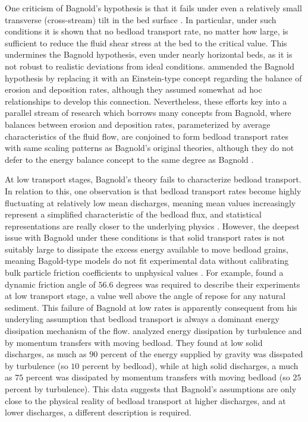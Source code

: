 \documentclass{article}
\begin{document}
One criticism of Bagnold's hypothesis is that it fails under even a relatively small transverse (cross-stream) tilt in the bed surface \citep{Seminara2002}. 
In particular, under such conditions it is shown that no bedload transport rate, no matter how large, is sufficient to reduce the fluid shear stress at the bed to the critical value.
This undermines the Bagnold hypothesis, even under nearly horizontal beds, as it is not robust to realistic deviations from ideal conditions. 
\citet{Parker2003} ammended the Bagnold hypothesis by replacing it with an Einstein-type concept regarding the balance of erosion and deposition rates, although they assumed somewhat ad hoc relationships to develop this connection. 
Nevertheless, these efforts key into a parallel stream of research which borrows many concepts from Bagnold, where balances between erosion and deposition rates, parameterized by average characteristics of the fluid flow, are conjoined to form bedload transport rates with same scaling patterns as Bagnold's original theories, although they do not defer to the energy balance concept to the same degree as Bagnold \citep{Charru2004, Charru2006, Lajenesse2010, Lajenesse2018}. 

At low transport stages, Bagnold's theory fails to characterize bedload transport.
In relation to this, one observation is that bedload transport rates become highly fluctuating at relatively low mean discharges, meaning mean values increasingly represent a simplified characteristic of the bedload flux, and statistical representations are really closer to the underlying physics \citep{Ancey2008}.
However, the deepest issue with Bagnold under these conditions is that solid transport rates is not suitably large to dissipate the excess energy available to move bedload grains, meaning Bagold-type models do not fit experimental data without calibrating bulk particle friction coefficients to unphysical values \citep{Engelund1976, Luque1976, Nelson1995, Nino1998}.
For example, \citet{Nino1998} found a dynamic friction angle of $56.6$ degrees was required to describe their experiments at low transport stage, a value well above the angle of repose for any natural sediment.
This failure of Bagnold at low rates is apparently consequent from his underyling assumption that bedload transport is always a dominant energy dissipation mechanism of the flow. 
\citet{Ancey2008} analyzed energy dissipation by turbulence and by momentum transfers with moving bedload.
They found at low solid discharges, as much as $90$ percent of the energy supplied by gravity was disspated by turbulence (so $10$ percent by bedload), while at high solid discharges, a much as $75$ percent was dissipated by momentum transfers with moving bedload (so $25$ percent by turbulence). 
This data suggests that Bagnold's assumptions are only close to the physical reality of bedload transport at higher discharges, and at lower discharges, a different description is required. 
\end{document}
